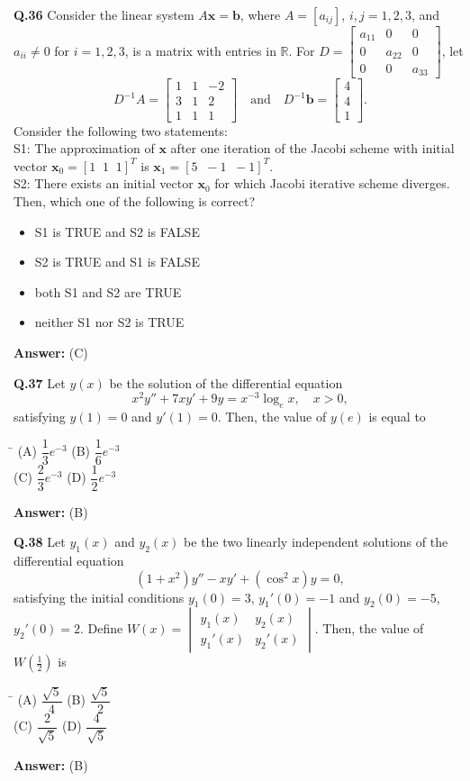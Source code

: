 \documentclass[11pt,a4paper]{article}
\newcommand{\optsfourA}[4]{%
  \begin{tabbing}
    \hspace{0.48\linewidth}\=\kill
    (A) #1 \> (B) #2 \\[2pt]
    (C) #3 \> (D) #4
  \end{tabbing}%
}
\newcommand{\optslistA}[4]{%
  \begin{itemize}
    \setlength{\itemsep}{2pt}\setlength{\parskip}{0pt}
    \item[(A)] #1
    \item[(B)] #2
    \item[(C)] #3
    \item[(D)] #4
  \end{itemize}%
}
\newcommand{\ans}[1]{\textbf{Answer:} #1\par\medskip}
\begin{document}
\textbf{Q.36} Consider the linear system $A\mathbf{x} = \mathbf{b}$, where $A = [a_{ij}]$, $i, j = 1, 2, 3$, and $a_{ii} \ne 0$ for $i = 1, 2, 3$, is a matrix with entries in $\mathbb{R}$. For $D = \begin{bmatrix} a_{11} & 0 & 0 \\ 0 & a_{22} & 0 \\ 0 & 0 & a_{33} \end{bmatrix}$, let
\[
  D^{-1}A = \begin{bmatrix} 1 & 1 & -2 \\ 3 & 1 & 2 \\ 1 & 1 & 1 \end{bmatrix} \quad \text{and} \quad D^{-1}\mathbf{b} = \begin{bmatrix} 4 \\ 4 \\ 1 \end{bmatrix}.
\]
Consider the following two statements:\\
S1: The approximation of $\mathbf{x}$ after one iteration of the Jacobi scheme with initial vector $\mathbf{x}_0 = [1 \;\; 1 \;\; 1]^T$ is $\mathbf{x}_1 = [5 \;\; -1 \;\; -1]^T$.\\
S2: There exists an initial vector $\mathbf{x}_0$ for which Jacobi iterative scheme diverges.\\
Then, which one of the following is correct?
\optslistA{S1 is TRUE and S2 is FALSE}{S2 is TRUE and S1 is FALSE}{both S1 and S2 are TRUE}{neither S1 nor S2 is TRUE}
\ans{(C)}

\textbf{Q.37} Let $y(x)$ be the solution of the differential equation
\[
  x^2 y'' + 7x y' + 9y = x^{-3} \log_e x, \quad x > 0,
\]
satisfying $y(1) = 0$ and $y'(1) = 0$. Then, the value of $y(e)$ is equal to
\optsfourA{$\dfrac{1}{3} e^{-3}$}{$\dfrac{1}{6} e^{-3}$}{$\dfrac{2}{3} e^{-3}$}{$\dfrac{1}{2} e^{-3}$}
\ans{(B)}

\textbf{Q.38} Let $y_1(x)$ and $y_2(x)$ be the two linearly independent solutions of the differential equation
\[
  (1 + x^2) y'' - x y' + (\cos^2 x) y = 0,
\]
satisfying the initial conditions $y_1(0) = 3$, $y_1'(0) = -1$ and $y_2(0) = -5$, $y_2'(0) = 2$. Define $W(x) = \begin{vmatrix} y_1(x) & y_2(x) \\ y_1'(x) & y_2'(x) \end{vmatrix}$. Then, the value of $W\!\left(\frac{1}{2}\right)$ is
\optsfourA{$\dfrac{\sqrt{5}}{4}$}{$\dfrac{\sqrt{5}}{2}$}{$\dfrac{2}{\sqrt{5}}$}{$\dfrac{4}{\sqrt{5}}$}
\ans{(B)}
\end{document}

